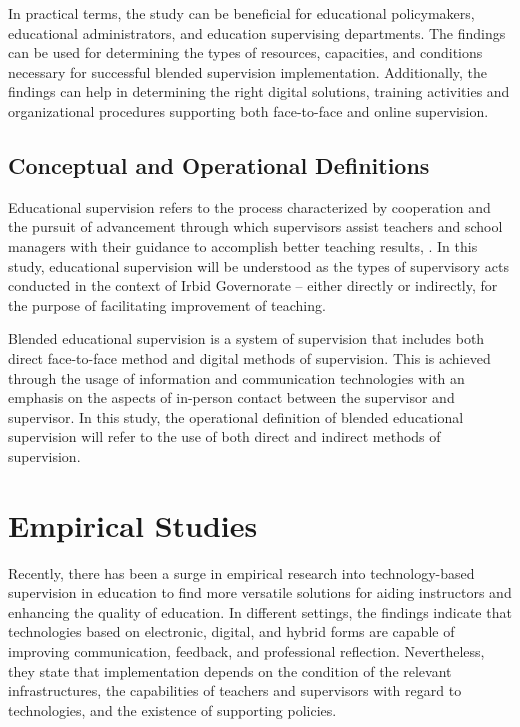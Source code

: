 \documentclass[10pt]{NSP1}
\begin{document}
In practical terms, the study can be beneficial for educational policymakers, educational administrators, and education supervising departments. The findings can be used for determining the types of resources, capacities, and conditions necessary for successful blended supervision implementation. Additionally, the findings can help in determining the right digital solutions, training activities and organizational procedures supporting both face-to-face and online supervision.

\subsection{Conceptual and Operational Definitions}

Educational supervision refers to the process characterized by cooperation and the pursuit of advancement through which supervisors assist teachers and school managers with their guidance to accomplish better teaching results, \cite{ref24}. In this study, educational supervision will be understood as the types of supervisory acts conducted in the context of Irbid Governorate -- either directly or indirectly, for the purpose of facilitating improvement of teaching.

Blended educational supervision is a system of supervision that includes both direct face-to-face method and digital methods of supervision. This is achieved through the usage of information and communication technologies with an emphasis on the aspects of in-person contact between the supervisor and supervisor. In this study, the operational definition of blended educational supervision will refer to the use of both direct and indirect methods of supervision.


\section{Empirical Studies}
Recently, there has been a surge in empirical research into technology-based supervision in education to find more versatile solutions for aiding instructors and enhancing the quality of education. In different settings, the findings indicate that technologies based on electronic, digital, and hybrid forms are capable of improving communication, feedback, and professional reflection. Nevertheless, they state that implementation depends on the condition of the relevant infrastructures, the capabilities of teachers and supervisors with regard to technologies, and the existence of supporting policies.
\end{document}
